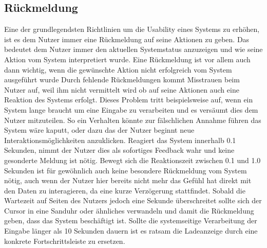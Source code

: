 \subsection*{Rückmeldung}

Eine der grundlegendsten Richtlinien um die Usability eines Systems zu erhöhen, ist es dem Nutzer immer eine Rückmeldung auf seine Aktionen zu geben.
Das bedeutet dem Nutzer immer den aktuellen Systemstatus anzuzeigen und wie seine Aktion vom System interpretiert wurde.
Eine Rückmeldung ist vor allem auch dann wichtig, wenn die gewünschte Aktion nicht erfolgreich vom System ausgeführt wurde
Durch fehlende Rückmeldungen kommt Misstrauen beim Nutzer auf, weil ihm nicht vermittelt wird ob auf seine Aktionen auch eine Reaktion des Systems erfolgt\cite{Knight.2019c}.
Dieses Problem tritt beispielsweise auf, wenn ein System lange braucht um eine Eingabe zu verarbeiten und es versäumt dies dem Nutzer mitzuteilen.
So ein Verhalten könnte zur fälschlichen Annahme führen das System wäre kaputt, oder dazu das der Nutzer beginnt neue Interaktionsmöglichkeiten anzuklicken.
Reagiert das System innerhalb 0.1 Sekunden, nimmt der Nutzer dies als sofortiges Feedback wahr und keine gesonderte Meldung ist nötig.
Bewegt sich die Reaktionszeit zwischen 0.1 und 1.0 Sekunden ist für gewöhnlich auch keine besondere Rückmeldung vom System nötig, auch wenn der Nutzer hier bereits nicht mehr das Gefühl hat direkt mit den Daten zu interagieren, da eine kurze Verzögerung stattfindet.
Sobald die Wartezeit auf Seiten des Nutzers jedoch eine Sekunde überschreitet sollte sich der Cursor in eine Sanduhr oder ähnliches verwandeln und damit die Rückmeldung geben, dass das System beschäftigt ist.
Sollte die systemseitige Verarbeitung der Eingabe länger als 10 Sekunden dauern ist es ratsam die Ladeanzeige durch eine konkrete Fortschrittsleiste zu ersetzen\cite{Nielsen.1995?}.


